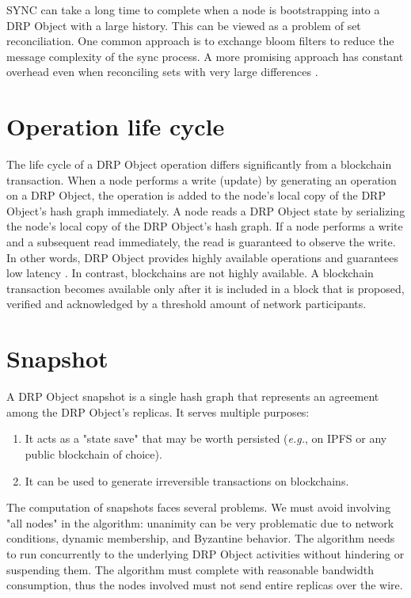 \documentclass{article}
\begin{document}
SYNC can take a long time to complete when a node is bootstrapping into a DRP Object with a large history. This can be viewed as a problem of set reconciliation. One common approach is to exchange bloom filters to reduce the message complexity of the sync process. A more promising approach has constant overhead even when reconciling sets with very large differences \cite{PRIBLT}.

\section{Operation life cycle}
\label{sec:headings}

The life cycle of a DRP Object operation differs significantly from a blockchain transaction. When a node performs a write (update) by generating an operation on a DRP Object, the operation is added to the node's local copy of the DRP Object's hash graph immediately. A node reads a DRP Object state by serializing the node's local copy of the DRP Object's hash graph. If a node performs a write and a subsequent read immediately, the read is guaranteed to observe the write. In other words, DRP Object provides highly available operations and guarantees low latency \cite{HAT}. In contrast, blockchains are not highly available. A blockchain transaction becomes available only after it is included in a block that is proposed, verified and acknowledged by a threshold amount of network participants.

\section{Snapshot}
\label{sec:headings}

A DRP Object snapshot is a single hash graph that represents an agreement among the DRP Object's replicas. It serves multiple purposes:
\begin{enumerate}
    \item It acts as a "state save" that may be worth persisted (\textit{e.g.}, on IPFS \cite{IPFS} or any public blockchain of choice).
    \item It can be used to generate irreversible transactions on blockchains.
\end{enumerate}

The computation of snapshots faces several problems. We must avoid involving "all nodes" in the algorithm: unanimity can be very problematic due to network conditions, dynamic membership, and Byzantine behavior. The algorithm needs to run concurrently to the underlying DRP Object activities without hindering or suspending them. The algorithm must complete with reasonable bandwidth consumption, thus the nodes involved must not send entire replicas over the wire.
\end{document}
